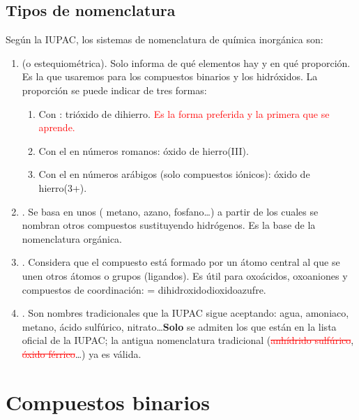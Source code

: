 \documentclass[12pt]{article}
\theoremstyle{mygreennumbox}
\newcommand{\mal}[1]{\textcolor{red}{\sout{#1}}}
\begin{document}
\subsection{Tipos de nomenclatura}

Según la IUPAC, los sistemas de nomenclatura de química inorgánica son:
\begin{enumerate}[label=\numberballblue]
    \item {} (o estequiométrica). Solo informa de qué elementos hay y en qué proporción. Es la que usaremos para los compuestos binarios y los hidróxidos. La proporción se puede indicar de tres formas:
          \begin{enumerate}[label=\itembolascolor{\arabic*}{blue}]
              \item Con :  trióxido de dihierro. \textcolor{red}{Es la forma preferida y la primera que se aprende.}
              \item Con el  en números romanos:  óxido de hierro(III).
              \item Con el  en números arábigos (solo compuestos iónicos):  óxido de hierro(3+).
          \end{enumerate}
    \item {}. Se basa en unos  ( metano,  azano,  fosfano\dots) a partir de los cuales se nombran otros compuestos sustituyendo hidrógenos. Es la base de la nomenclatura orgánica.
    \item {}. Considera que el compuesto está formado por un átomo central al que se unen otros átomos o grupos (ligandos). Es útil para oxoácidos, oxoaniones y compuestos de coordinación:  = \ch{[SO2(OH)2]} dihidroxidodioxidoazufre.
    \item {}. Son nombres tradicionales que la IUPAC sigue aceptando: agua, amoniaco, metano, ácido sulfúrico, nitrato\dots \textbf{Solo} se admiten los que están en la lista oficial de la IUPAC; la antigua nomenclatura tradicional (\mal{anhídrido sulfúrico}, \mal{óxido férrico}\dots) ya  es válida.
\end{enumerate}

\section{Compuestos binarios}\label{sec:binarios}
\end{document}
